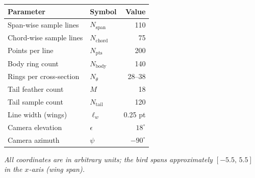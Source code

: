 \documentclass[12pt,a4paper]{article}
\begin{document}
\begin{center}
\renewcommand{\arraystretch}{1.4}
\begin{tabular}{llr}
  \toprule
  Parameter                 & Symbol          & Value  \\
  \midrule
  Span-wise sample lines    & $N_{\mathrm{span}}$  & 110 \\
  Chord-wise sample lines   & $N_{\mathrm{chord}}$ & 75  \\
  Points per line           & $N_{\mathrm{pts}}$   & 200 \\
  Body ring count           & $N_{\mathrm{body}}$  & 140 \\
  Rings per cross-section   & $N_\theta$           & 28--38 \\
  Tail feather count        & $M$                  & 18  \\
  Tail sample count         & $N_{\mathrm{tail}}$  & 120 \\
  Line width (wings)        & $\ell_w$             & 0.25 pt \\
  Camera elevation          & $\epsilon$           & $18^\circ$ \\
  Camera azimuth            & $\psi$               & $-90^\circ$ \\
  \bottomrule
\end{tabular}
\end{center}

\vspace{1em}
\begin{center}
  \small\textit{All coordinates are in arbitrary units; the bird spans
  approximately $[-5.5,\,5.5]$ in the $x$-axis (wing span).}
\end{center}
\end{document}
